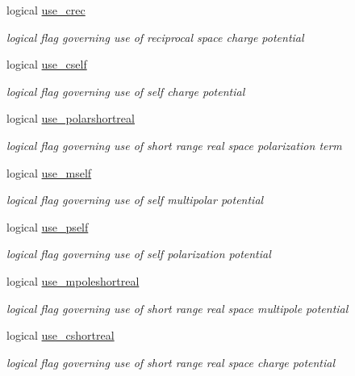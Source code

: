 \begin{DoxyCompactItemize}
logical \hyperlink{classpotent_a97859e184e6246ff5b45c4563f7d6a75}{use\-\_\-crec}
\begin{DoxyCompactList}\small\item\em logical flag governing use of reciprocal space charge potential \end{DoxyCompactList}\item 
logical \hyperlink{classpotent_a7ac9d4ba1a8f68a8c11f952cd7985dab}{use\-\_\-cself}
\begin{DoxyCompactList}\small\item\em logical flag governing use of self charge potential \end{DoxyCompactList}\item 
logical \hyperlink{classpotent_a5ab904b7150799c7cd354d07fc5d4d43}{use\-\_\-polarshortreal}
\begin{DoxyCompactList}\small\item\em logical flag governing use of short range real space polarization term \end{DoxyCompactList}\item 
logical \hyperlink{classpotent_a9860e6d722e3fabc21fdc89fe55d6fd4}{use\-\_\-mself}
\begin{DoxyCompactList}\small\item\em logical flag governing use of self multipolar potential \end{DoxyCompactList}\item 
logical \hyperlink{classpotent_aff1309d0a0e73e73c68e82900de2d4d4}{use\-\_\-pself}
\begin{DoxyCompactList}\small\item\em logical flag governing use of self polarization potential \end{DoxyCompactList}\item 
logical \hyperlink{classpotent_a37a7b683869b844b2129bf9d14848171}{use\-\_\-mpoleshortreal}
\begin{DoxyCompactList}\small\item\em logical flag governing use of short range real space multipole potential \end{DoxyCompactList}\item 
logical \hyperlink{classpotent_a06a4cfb9960a168b860e50c0c70b0cf3}{use\-\_\-cshortreal}
\begin{DoxyCompactList}\small\item\em logical flag governing use of short range real space charge potential \end{DoxyCompactList}\item 

\end{DoxyCompactItemize}

